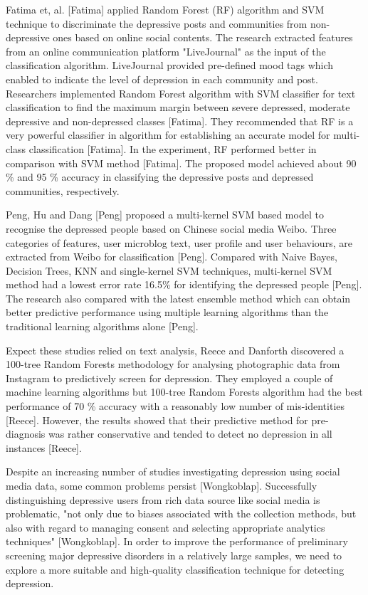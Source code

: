 \documentclass[runningheads]{llncs}
\begin{document}
Fatima et, al. [Fatima] applied Random Forest (RF) algorithm and SVM technique to discriminate the depressive posts and communities from non-depressive ones based on online social contents. The research extracted features from an online communication platform "LiveJournal" as the input of the classification algorithm. LiveJournal provided pre-defined mood tags which enabled to indicate the level of depression in each community and post. Researchers implemented Random Forest algorithm with SVM classifier for text classification to find the maximum margin between severe depressed, moderate depressive and non-depressed classes [Fatima]. They recommended that RF is a very powerful classifier in algorithm for establishing an accurate model for multi-class classification [Fatima]. In the experiment, RF performed better in comparison with SVM method [Fatima]. The proposed model achieved about 90 \% and 95 \% accuracy in classifying the depressive posts and depressed communities, respectively.

Peng, Hu and Dang [Peng] proposed a multi-kernel SVM based model to recognise the depressed people based on Chinese social media Weibo. Three categories of features, user microblog text, user profile and user behaviours, are extracted from Weibo for classification [Peng]. Compared with Naive Bayes, Decision Trees, KNN and single-kernel SVM techniques, multi-kernel SVM method had a lowest error rate 16.5\% for identifying the depressed people [Peng]. The research also compared with the latest ensemble method which can obtain better predictive performance using multiple learning algorithms than the traditional learning algorithms alone [Peng].

Expect these studies relied on text analysis, Reece and Danforth discovered a 100-tree Random Forests methodology for analysing photographic data from Instagram to predictively screen for depression. They employed a couple of machine learning algorithms but 100-tree Random Forests algorithm had the best performance of 70 \% accuracy with a reasonably low number of mis-identities [Reece]. However, the results showed that their predictive method for pre-diagnosis was rather conservative and tended to detect no depression in all instances [Reece]. 

Despite an increasing number of studies investigating depression using social media data, some common problems persist [Wongkoblap]. Successfully distinguishing depressive users from rich­ data source like social media is problematic, "not only due to biases associated with the collection methods, but also with regard to managing consent and selecting appropriate analytics techniques" [Wongkoblap]. In order to improve the performance of preliminary screening major depressive disorders in a relatively large samples, we need to explore a more suitable and high-quality classification technique for detecting depression.
%
%
%
%
\end{document}
